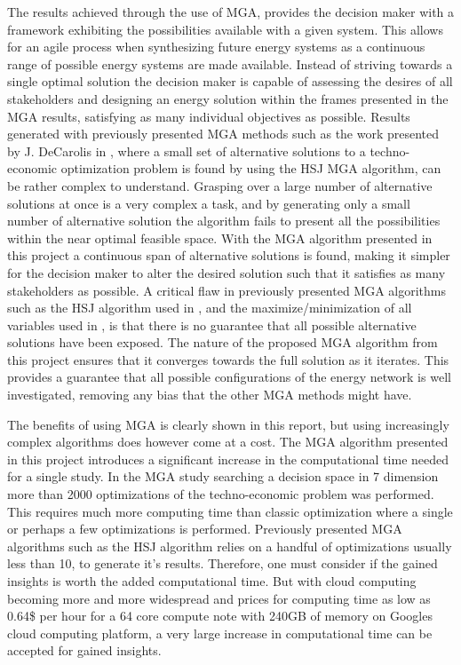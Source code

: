 The results achieved through the use of MGA, provides the decision maker with a framework exhibiting the possibilities available with a given system. This allows for an agile process when synthesizing future energy systems as a continuous range of possible energy systems are made available. Instead of striving towards a single optimal solution the decision maker is capable of assessing the desires of all stakeholders and designing an energy solution within the frames presented in the MGA results, satisfying as many individual objectives as possible. 
Results generated with previously presented MGA methods such as the work presented by J. DeCarolis in \cite{DeCarolis_MGA}, where a small set of alternative solutions to a techno-economic optimization problem is found by using the HSJ MGA algorithm, can be rather complex to understand. Grasping over a large number of alternative solutions at once is a very complex a task, and by generating only a small number of alternative solution the algorithm fails to present all the possibilities within the near optimal feasible space. With the MGA algorithm presented in this project a continuous span of alternative solutions is found, making it simpler for the decision maker to alter the desired solution such that it satisfies as many stakeholders as possible. 
A critical flaw in previously presented MGA algorithms such as the HSJ algorithm used in \cite{DeCarolis_MGA}, and the maximize/minimization of all variables used in \cite{Fabian_MGA}, is that there is no guarantee that all possible alternative solutions have been exposed. The nature of the proposed MGA algorithm from this project ensures that it converges towards the full solution as it iterates. This provides a guarantee that all possible configurations of the energy network is well investigated, removing any bias that the other MGA methods might have. 

The benefits of using MGA is clearly shown in this report, but using increasingly complex algorithms does however come at a cost. The MGA algorithm presented in this project introduces a significant increase in the computational time needed for a single study. In the MGA study searching a decision space in 7 dimension more than 2000 optimizations of the techno-economic problem was performed. This requires much more computing time than classic optimization where a single or perhaps a few optimizations is performed. Previously presented MGA algorithms such as the HSJ \cite{DeCarolis_MGA} algorithm relies on a handful of optimizations usually less than 10, to generate it's results. Therefore, one must consider if the gained insights is worth the added computational time. But with cloud computing becoming more and more widespread and prices for computing time as low as 0.64\$ per hour for a 64 core compute note with 240GB of memory \cite{Google_Cloud} on Googles cloud computing platform, a very large increase in computational time can be accepted for gained insights. 

